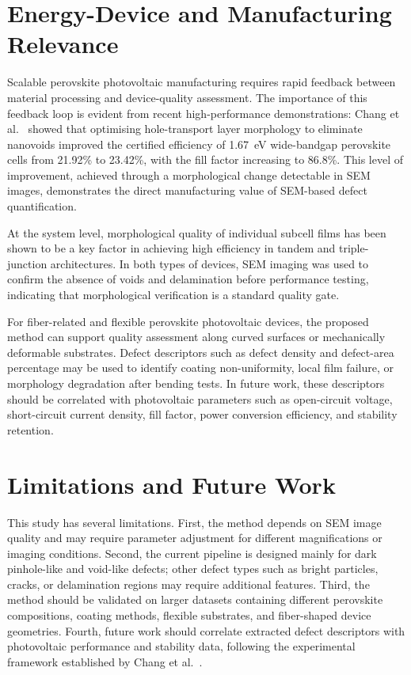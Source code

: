 \documentclass[pdflatex,sn-mathphys-num,iicol]{sn-jnl}
\theoremstyle{thmstyleone}
\theoremstyle{thmstyletwo}
\theoremstyle{thmstylethree}
\begin{document}
\section{Energy-Device and Manufacturing Relevance}
\label{sec:energy_relevance}

Scalable perovskite photovoltaic manufacturing requires rapid feedback
between material processing and device-quality assessment. The
importance of this feedback loop is evident from recent high-performance
demonstrations: Chang et al.\ \cite{chang2026} showed that optimising
hole-transport layer morphology to eliminate nanovoids improved the
certified efficiency of 1.67~eV wide-bandgap perovskite cells from
21.92\% to 23.42\%, with the fill factor increasing to 86.8\%. This
level of improvement, achieved through a morphological change
detectable in SEM images, demonstrates the direct manufacturing value
of SEM-based defect quantification.

At the system level, morphological quality of individual subcell
films has been shown to be a key factor in achieving high efficiency
in tandem \cite{chang2026} and triple-junction \cite{zheng2025}
architectures. In both types of devices, SEM imaging was used to
confirm the absence of voids and delamination before performance
testing, indicating that morphological verification is a standard
quality gate.

For fiber-related and flexible perovskite photovoltaic devices, the
proposed method can support quality assessment along curved surfaces
or mechanically deformable substrates. Defect descriptors such as
defect density and defect-area percentage may be used to identify
coating non-uniformity, local film failure, or morphology degradation
after bending tests. In future work, these descriptors should be
correlated with photovoltaic parameters such as open-circuit voltage,
short-circuit current density, fill factor, power conversion
efficiency, and stability retention.


\section{Limitations and Future Work}\label{sec:limitations}

This study has several limitations. First, the method depends on SEM
image quality and may require parameter adjustment for different
magnifications or imaging conditions. Second, the current pipeline
is designed mainly for dark pinhole-like and void-like defects; other
defect types such as bright particles, cracks, or delamination
regions may require additional features. Third, the method should be
validated on larger datasets containing different perovskite
compositions, coating methods, flexible substrates, and fiber-shaped
device geometries. Fourth, future work should correlate extracted
defect descriptors with photovoltaic performance and stability data,
following the experimental framework established by Chang et al.\
\cite{chang2026}.
\end{document}
